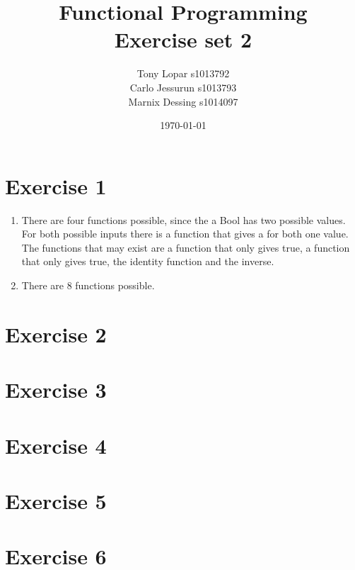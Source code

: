\documentclass{article}
\begin{document}
\title{Functional Programming \\ Exercise set 2}
\date{\today}
\author{Tony Lopar s1013792 \\ Carlo Jessurun s1013793 \\ Marnix Dessing s1014097}
\maketitle

\section*{Exercise 1}
\begin{enumerate}
  \item There are four functions possible, since the a Bool has two possible values. For both possible inputs there is a function that gives a for both one value. The functions that may exist are a function that only gives true, a function that only gives true, the identity function and the inverse.
  \item There are 8 functions possible.
\end{enumerate}

\section*{Exercise 2}


\section*{Exercise 3}


\section*{Exercise 4}


\section*{Exercise 5}


\section*{Exercise 6}
\end{document}
